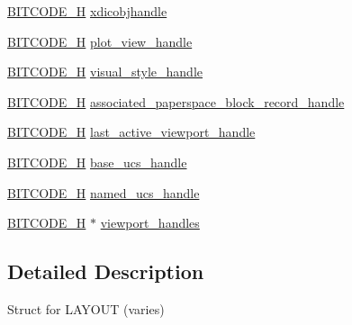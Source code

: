 \begin{DoxyCompactItemize}
\hyperlink{dwg_8h_a7c700e94e047a97ba8c24bdfe4029dc3}{\-B\-I\-T\-C\-O\-D\-E\-\_\-\-H} \hyperlink{struct__dwg__object__LAYOUT_adf6eb76ae41af663643f49968b2dd855}{xdicobjhandle}
\item 
\hyperlink{dwg_8h_a7c700e94e047a97ba8c24bdfe4029dc3}{\-B\-I\-T\-C\-O\-D\-E\-\_\-\-H} \hyperlink{struct__dwg__object__LAYOUT_aa7efe31a34eae8ed5a02ed1b2e487475}{plot\-\_\-view\-\_\-handle}
\item 
\hyperlink{dwg_8h_a7c700e94e047a97ba8c24bdfe4029dc3}{\-B\-I\-T\-C\-O\-D\-E\-\_\-\-H} \hyperlink{struct__dwg__object__LAYOUT_ab5ebc7c29d946dd247c453f8d87c3480}{visual\-\_\-style\-\_\-handle}
\item 
\hyperlink{dwg_8h_a7c700e94e047a97ba8c24bdfe4029dc3}{\-B\-I\-T\-C\-O\-D\-E\-\_\-\-H} \hyperlink{struct__dwg__object__LAYOUT_aa5146d2c2a9fd0954b1b729337b9aa18}{associated\-\_\-paperspace\-\_\-block\-\_\-record\-\_\-handle}
\item 
\hyperlink{dwg_8h_a7c700e94e047a97ba8c24bdfe4029dc3}{\-B\-I\-T\-C\-O\-D\-E\-\_\-\-H} \hyperlink{struct__dwg__object__LAYOUT_a94bdd59527123eee8070b14fb619b481}{last\-\_\-active\-\_\-viewport\-\_\-handle}
\item 
\hyperlink{dwg_8h_a7c700e94e047a97ba8c24bdfe4029dc3}{\-B\-I\-T\-C\-O\-D\-E\-\_\-\-H} \hyperlink{struct__dwg__object__LAYOUT_abf9f1884594920984d45fb7698f34b1c}{base\-\_\-ucs\-\_\-handle}
\item 
\hyperlink{dwg_8h_a7c700e94e047a97ba8c24bdfe4029dc3}{\-B\-I\-T\-C\-O\-D\-E\-\_\-\-H} \hyperlink{struct__dwg__object__LAYOUT_a6d9593361f783a5e144c9d82a73232c6}{named\-\_\-ucs\-\_\-handle}
\item 
\hyperlink{dwg_8h_a7c700e94e047a97ba8c24bdfe4029dc3}{\-B\-I\-T\-C\-O\-D\-E\-\_\-\-H} $\ast$ \hyperlink{struct__dwg__object__LAYOUT_a7186b4f35d2538e282b4bb73084c6994}{viewport\-\_\-handles}
\end{DoxyCompactItemize}


\subsection{\-Detailed \-Description}
\-Struct for \-L\-A\-Y\-O\-U\-T (varies) 

